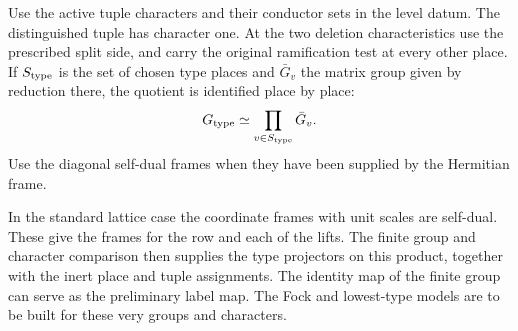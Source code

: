 Use the active tuple characters and their conductor sets in the
level datum. The distinguished tuple has character one. At the
two deletion characteristics use the prescribed split side, and
carry the original ramification test at every other place. If \(S_{\rm type}\) is the set of chosen type places and \(\bar G_v\) the matrix group given by reduction there, the quotient is identified place by place:
\[
 G_{\rm type}\simeq\prod_{v\in S_{\rm type}}\bar G_v .
\] Use the diagonal self-dual
frames when they have been supplied by the Hermitian frame.

In
the standard lattice case the coordinate frames with unit scales
are self-dual. These give the frames for the row and each of the
lifts. The finite group and character comparison then supplies
the type projectors on this product, together with the inert place
and tuple assignments. The identity map of the finite group can
serve as the preliminary label map. The Fock and lowest-type
models are to be built for these very groups and characters.
\label{cor:automorphic-realization-2}


